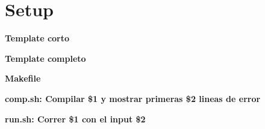 \section{Setup}
    \textbf{Template corto}
    

    \textbf{Template completo}
    
    
    \textbf{Makefile}
    
    
    \textbf{comp.sh: Compilar \$1 y mostrar primeras \$2 lineas de error}
    
    
    \textbf{run.sh: Correr \$1 con el input \$2}
    